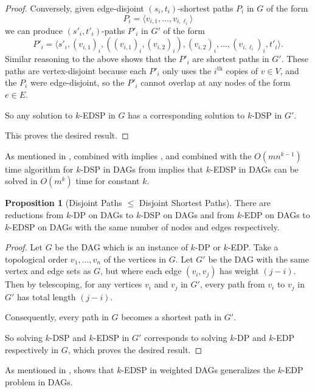 \documentclass[11pt]{article}
\theoremstyle{definition}
\newtheorem{proposition}[theorem]{Proposition}
\begin{document}
\begin{proof}
    Conversely, given edge-disjoint $(s_i,t_i)$-shortest paths $P_i$ in $G$ of the form 
    \[P_i = \langle v_{i,1}, \dots, v_{i,\ell_i}\rangle \]
    we can produce $(s'_i,t'_i)$-paths $P'_i$ in $G'$ of the form 
    \[P'_i = \langle s'_i, (v_{i,1})_i, ((v_{i,1})_i, (v_{i,2})_i), (v_{i,2})_i, \dots, (v_{i,\ell_i})_i, t'_i\rangle.\]
    Similar reasoning to the above shows that the $P'_i$ are shortest paths in $G'$.
    These paths are vertex-disjoint because each $P'_i$ only uses the $i^{\text{th}}$ copies of $v\in V$, and the $P_i$ were edge-disjoint, so the $P'_i$ cannot overlap at any nodes of the form $e\in E$.

    So any solution to \textsf{$k$-EDSP} in $G$ has a corresponding solution to \textsf{$k$-DSP} in $G'$.

    This proves the desired result.
\end{proof}

As mentioned in ,  combined with  implies , and   combined with the $O(mn^{k-1})$ time algorithm for \textsf{$k$-DSP} in DAGs from  \cite[Theorem 3]{FortuneHopcroftWyllie1980} implies that \textsf{$k$-EDSP} in DAGs can be solved in $O(m^k)$ time for constant $k$.


\begin{proposition}[Disjoint Paths $\le$ Disjoint Shortest Paths]
    \label{app-prop:vertex-to-edge}
    There are reductions from \textsf{$k$-DP} on DAGs  to  \textsf{$k$-DSP} on DAGs and from \textsf{$k$-EDP} on DAGs to \textsf{$k$-EDSP} on DAGs with the same number of nodes and edges respectively.
\end{proposition}
\begin{proof}
    Let $G$ be the DAG which is an instance of \textsf{$k$-DP} or \textsf{$k$-EDP}.
    Take a topological order $v_1, \dots, v_n$ of the vertices in $G$.
    Let $G'$ be the DAG with the same vertex and edge sets as $G$, but where each edge $(v_i,v_j)$ has weight $(j-i)$.
    Then by telescoping, for any vertices $v_i$ and $v_j$ in $G'$, every path from $v_i$ to $v_j$ in $G'$ has total length $(j-i)$.
    
    Consequently, every path in $G$ becomes a shortest path in $G'$.
    
    So solving \textsf{$k$-DSP} and \textsf{$k$-EDSP} in $G'$ corresponds to solving \textsf{$k$-DP} and \textsf{$k$-EDP} respectively in $G$, which proves the desired result.
\end{proof}

As mentioned in ,  shows that \textsf{$k$-EDSP} in weighted DAGs generalizes the \textsf{$k$-EDP} problem in DAGs.
\end{document}
